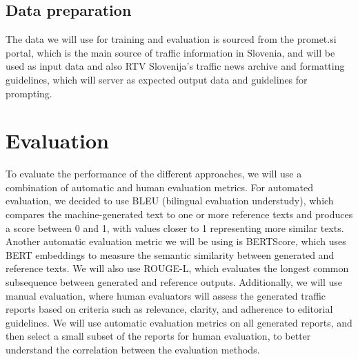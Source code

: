 \documentclass[fleqn,moreauthors,10pt]{ds_report}
\begin{document}
\subsection{Data preparation}
The data we will use for training and evaluation is sourced from the promet.si portal, which is the main source of traffic information in Slovenia, and will be used as input data and also RTV Slovenija's traffic news archive and formatting guidelines, which will server as expected output data and guidelines for prompting.

\section*{Evaluation}
To evaluate the performance of the different approaches, we will use a combination of automatic and human evaluation metrics. For automated evaluation, we decided to use BLEU (bilingual evaluation understudy), which compares the machine-generated text to one or more reference texts and produces a score between 0 and 1, with values closer to 1 representing more similar texts. Another automatic evaluation metric we will be using is BERTScore, which uses BERT embeddings to measure the semantic similarity between generated and reference texts. We will also use ROUGE-L, which evaluates the longest common subsequence between generated and reference outputs. Additionally, we will use manual evaluation, where human evaluators will assess the generated traffic reports based on criteria such as relevance, clarity, and adherence to editorial guidelines. We will use automatic evaluation metrics on all generated reports, and then select a small subset of the reports for human evaluation, to better understand the correlation between the evaluation methods.


\end{document}
